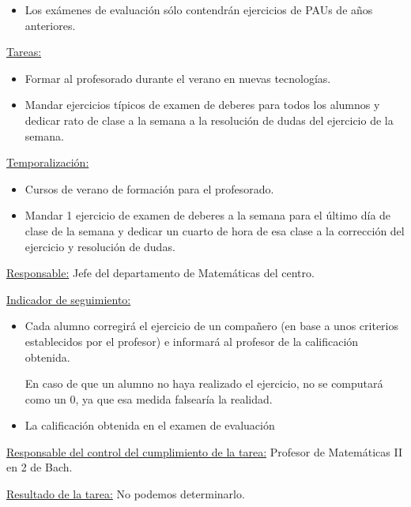 {\begin{itemize}
	\item Los exámenes de evaluación sólo contendrán ejercicios de PAUs de años anteriores.

\end{itemize}

\ul{Tareas:}
\vspace{-0.3cm}
\begin{itemize}
	\item Formar al profesorado durante el verano en nuevas tecnologías.

	\item Mandar ejercicios típicos de examen de deberes para todos los alumnos y dedicar rato de clase a la semana a la resolución de dudas del ejercicio de la semana.

\end{itemize}


\ul{Temporalizaci\'on:}
\vspace{-0.3cm}
\begin{itemize}
	\item Cursos de verano de formación para el profesorado.

	\item Mandar 1 ejercicio de examen de deberes a la semana para el último día de clase de la semana y dedicar un cuarto de hora de esa clase a la corrección del ejercicio y resolución de dudas.

\end{itemize}

\ul{Responsable:}
Jefe del departamento de Matemáticas del centro.


\ul{Indicador de seguimiento:}
\vspace{-0.3cm}
\begin{itemize}
	\item Cada alumno corregirá el ejercicio de un compañero (en base a unos criterios establecidos por el profesor) e informará al profesor de la calificación obtenida.

	\subitem En caso de que un alumno no haya realizado el ejercicio, no se computará como un 0, ya que esa medida falsearía la realidad.

	\item La calificación obtenida en el examen de evaluación 
\end{itemize}

\ul{Responsable del control del cumplimiento de la tarea:}
Profesor de Matemáticas II en 2 de Bach.


\ul{Resultado de la tarea:}
No podemos determinarlo.


}

